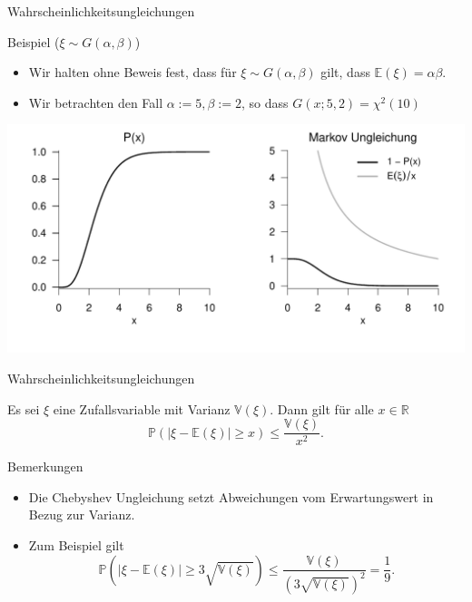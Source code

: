 \documentclass[
  8pt,
  ignorenonframetext,
]{beamer}
\providecommand{\tightlist}{%
  \setlength{\itemsep}{0pt}\setlength{\parskip}{0pt}}
\begin{document}
\begin{frame}{Wahrscheinlichkeitsungleichungen}
\protect\hypertarget{wahrscheinlichkeitsungleichungen-2}{}
\small

Beispiel (\(\xi \sim G(\alpha,\beta)\)) \vspace{1mm} \small

\begin{itemize}
\item Wir halten ohne Beweis fest, dass für $\xi \sim G(\alpha,\beta)$ gilt, dass $\mathbb{E}(\xi) = \alpha\beta$.
\item Wir betrachten den Fall $\alpha := 5, \beta := 2$, so dass $G(x;5,2) = \chi^2(10)$
\end{itemize}

\begin{center}\includegraphics[width=0.95\linewidth]{7_Abbildungen/wtfi_7_markov_ungleichung} \end{center}
\end{frame}

\begin{frame}{Wahrscheinlichkeitsungleichungen}
\protect\hypertarget{wahrscheinlichkeitsungleichungen-3}{}
\small
\begin{theorem}
\justifying
\normalfont
Es sei $\xi$ eine Zufallsvariable mit Varianz $\mathbb{V}(\xi)$. Dann gilt für alle $x \in \mathbb{R}$
\begin{equation}
\mathbb{P}(|\xi - \mathbb{E}(\xi)| \ge x) \le \frac{\mathbb{V}(\xi)}{x^2}.
\end{equation}
\end{theorem}
\footnotesize

Bemerkungen

\begin{itemize}
\tightlist
\item
  Die Chebyshev Ungleichung setzt Abweichungen vom Erwartungswert in
  Bezug zur Varianz.
\item
  Zum Beispiel gilt \begin{equation}
  \mathbb{P}\left(|\xi - \mathbb{E}(\xi)| \ge 3 \sqrt{\mathbb{V}(\xi)}\right)
  \le  \frac{\mathbb{V}(\xi)}{\left(3 \sqrt{\mathbb{V}(\xi)}\right)^2} =
  \frac{1}{9}.
  \end{equation}
\end{itemize}
\end{frame}
\end{document}
